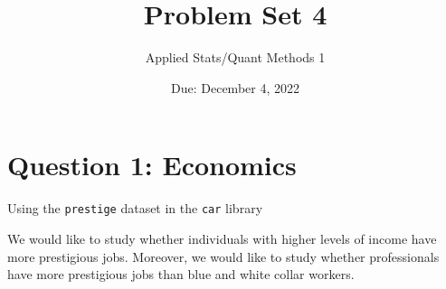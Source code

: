 \documentclass[12pt,letterpaper]{article}
\title{Problem Set 4}
\date{Due: December 4, 2022}
\author{Applied Stats/Quant Methods 1}
\begin{document}
	\maketitle

\section*{Question 1: Economics}
\vspace{.25cm}
\noindent  Using the \texttt{prestige} dataset in the \texttt{car} library

  

\noindent We would like to study whether individuals with higher levels of income have more prestigious jobs. Moreover, we would like to study whether professionals have more prestigious jobs than blue and white collar workers.
\end{document}
